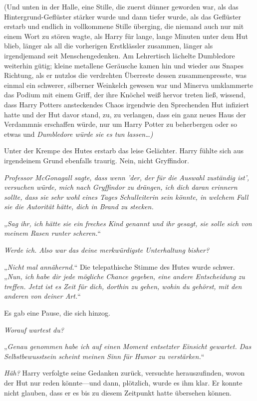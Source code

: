 {(Und unten in der Halle, eine Stille, die zuerst dünner geworden war, als das Hintergrund-Geflüster stärker wurde und dann tiefer wurde, als das Geflüster erstarb und endlich in vollkommene Stille überging, die niemand auch nur mit einem Wort zu stören wagte, als Harry für lange, lange Minuten unter dem Hut blieb, länger als all die vorherigen Erstklässler zusammen, länger als irgendjemand seit Menschengedenken. Am Lehrertisch lächelte Dumbledore weiterhin gütig; kleine metallene Geräusche kamen hin und wieder aus Snapes Richtung, als er nutzlos die verdrehten Überreste dessen zusammenpresste, was einmal ein schwerer, silberner Weinkelch gewesen war und Minerva umklammerte das Podium mit einem Griff, der ihre Knöchel weiß hervor treten ließ, wissend, dass Harry Potters ansteckendes Chaos irgendwie den Sprechenden Hut infiziert hatte und der Hut davor stand, zu, zu verlangen, dass ein ganz neues Haus der Verdammnis erschaffen würde, nur um Harry Potter zu beherbergen oder so etwas und \emph{Dumbledore würde sie es tun lassen…)}

Unter der Krempe des Hutes erstarb das leise Gelächter. Harry fühlte sich aus irgendeinem Grund ebenfalls traurig. Nein, nicht Gryffindor.

\emph{Professor McGonagall sagte, dass wenn 'der, der für die Auswahl zuständig ist', versuchen würde, mich nach Gryffindor zu drängen, ich dich daran erinnern sollte, dass sie sehr wohl eines Tages Schulleiterin sein könnte, in welchem Fall sie die Autorität hätte, dich in Brand zu stecken.}

„\emph{Sag ihr, ich hätte sie ein freches Kind genannt und ihr gesagt, sie solle sich von meinem Rasen runter scheren.}“

\emph{Werde ich. Also war das deine merkwürdigste Unterhaltung bisher?}

„\emph{Nicht mal annähernd.}“ Die telepathische Stimme des Hutes wurde schwer. „\emph{Nun, ich habe dir jede mögliche Chance gegeben, eine andere Entscheidung zu treffen. Jetzt ist es Zeit für dich, dorthin zu gehen, wohin du gehörst, mit den anderen von deiner Art.}“

Es gab eine Pause, die sich hinzog.

\emph{Worauf wartest du?}

„\emph{Genau genommen habe ich auf einen Moment entsetzter Einsicht gewartet. Das Selbstbewusstsein scheint meinen Sinn für Humor zu verstärken.}“

\emph{Häh?} Harry verfolgte seine Gedanken zurück, versuchte herauszufinden, wovon der Hut nur reden könnte—und dann, plötzlich, wurde es ihm klar. Er konnte nicht glauben, dass er es bis zu diesem Zeitpunkt hatte übersehen können.

}

